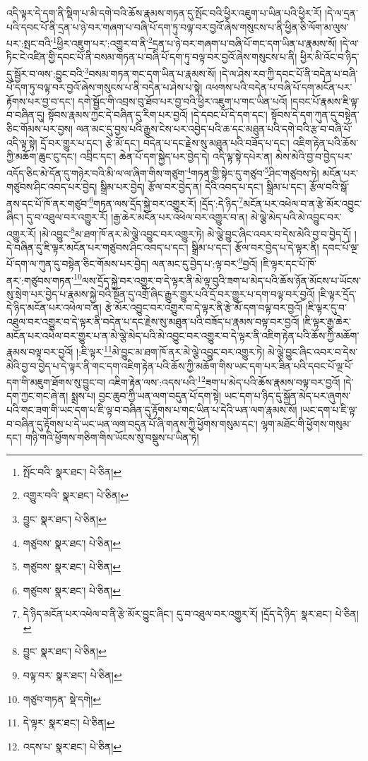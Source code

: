 འདི་ལྟར་དེ་དག་ནི་སྡིག་པ་མི་དགེ་བའི་ཆོས་རྣམས་གཏན་དུ་སྤོང་བའི་ཕྱིར་འཇུག་པ་ཡིན་པའི་ཕྱིར་རོ། །དེ་ལ་དྲན་པའི་དབང་པོ་ནི་དྲན་པ་ཉེ་བར་གཞག་པ་བཞི་པོ་དག་ཏུ་བལྟ་བར་བྱའོ་ཞེས་གསུངས་པ་ནི་ཕྱིན་ཅི་ལོག་མ་ལུས་པར་:སྤང་བའི་\footnote{སྤོང་བའི་  སྣར་ཐང་།  པེ་ཅིན། }ཕྱིར་འཇུག་པར་:འགྱུར་བ་ནི་\footnote{འགྱུར་བའི་  སྣར་ཐང་།  པེ་ཅིན། }དྲན་པ་ཉེ་བར་གཞག་པ་བཞི་པོ་གང་དག་ཡིན་པ་རྣམས་སོ། །དེ་ལ་ཏིང་ངེ་འཛིན་གྱི་དབང་པོ་ནི་བསམ་གཏན་པ་བཞི་པོ་དག་ཏུ་བལྟ་བར་བྱའོ་ཞེས་གསུངས་པ་ནི། ཕྱིར་མི་འོང་བ་ཉིད་དུ་སྦྱོར་བ་ལས་:བྱུང་བའི་\footnote{བྱུང་  སྣར་ཐང་།  པེ་ཅིན། }བསམ་གཏན་གང་དག་ཡིན་པ་རྣམས་སོ། །དེ་ལ་ཤེས་རབ་ཀྱི་དབང་པོ་ནི་བདེན་པ་བཞི་པོ་དག་ཏུ་བལྟ་བར་བྱའོ་ཞེས་གསུངས་པ་ནི་བདེན་པ་ཤེས་པ་སྟེ། འཕགས་པའི་བདེན་པ་བཞི་པོ་དག་མངོན་པར་རྟོགས་པར་བྱ་བ་དང་། དགེ་སྦྱོང་གི་འབྲས་བུ་ཐོབ་པར་བྱ་བའི་ཕྱིར་འཇུག་པ་གང་ཡིན་པའོ། །དབང་པོ་རྣམས་ཇི་ལྟ་བ་བཞིན་དུ། སྟོབས་རྣམས་ཀྱང་དེ་བཞིན་དུ་རིག་པར་བྱའོ། །དེ་དབང་པོ་དེ་དག་དང་། སྟོབས་དེ་དག་ཀུན་དུ་བསྟེན་ཅིང་གོམས་པར་བྱས། ལན་མང་དུ་བྱས་པའི་རྒྱུས་ངེས་པར་འབྱེད་པའི་ཆ་དང་མཐུན་པའི་དགེ་བའི་རྩ་བ་བཞི་པོ་འདི་ལྟ་སྟེ། དྲོ་བར་གྱུར་པ་དང་། རྩེ་མོ་དང་། བདེན་པ་དང་རྗེས་སུ་མཐུན་པའི་བཟོད་པ་དང་། འཇིག་རྟེན་པའི་ཆོས་ཀྱི་མཆོག་ཆུང་ངུ་དང་། འབྲིང་དང་། ཆེན་པོ་དག་སྐྱེད་པར་བྱེད་དེ། འདི་ལྟ་སྟེ་དཔེར་ན། མེས་མེའི་བྱ་བ་བྱེད་པར་འདོད་ཅིང་མེ་དོན་དུ་གཉེར་བའི་མི་ལ་ལ་ཞིག་གིས་གཙུག་\footnote{གཙུབས་  སྣར་ཐང་།  པེ་ཅིན། }གཏན་གྱི་སྟེང་དུ་གཙུབ་\footnote{གཙུབས་  སྣར་ཐང་།  པེ་ཅིན། }ཤིང་གཙུབས་ཏེ། མངོན་པར་གཙུབས་ཤིང་འབད་པར་བྱེད། སྒྲིམ་པར་བྱེད། རྩོལ་བར་བྱེད་ན། དེའི་འབད་པ་དང་། སྒྲིམ་པ་དང་། རྩོལ་བའི་སྒོ་ནས་དང་པོ་ཁོ་ནར་གཙུབ་\footnote{གཙུབས་  སྣར་ཐང་།  པེ་ཅིན། }གཏན་ལས་དྲོད་སྐྱེ་བར་འགྱུར་རོ། །དྲོད་:དེ་ཉིད་\footnote{དེ་ཉིད་མངོན་པར་འཕེལ་བ་ནི་རྩེ་མོར་བྱུང་ཞིང་། དུ་བ་འཐུལ་བར་འགྱུར་རོ། །དྲོད་དེ་ཉིད་  སྣར་ཐང་།  པེ་ཅིན། }མངོན་པར་འཕེལ་བ་ན་རྩེ་མོར་འབྱུང་ཞིང་། དུ་བ་འཐུལ་བར་འགྱུར་རོ། །རྒྱ་ཆེར་མངོན་པར་འཕེལ་བར་འགྱུར་བ་ན། མེ་ལྕེ་མེད་པའི་མེ་འབྱུང་བར་འགྱུར་རོ། །མེ་འབྱུང་\footnote{བྱུང་  སྣར་ཐང་།  པེ་ཅིན། }མ་ཐག་ཁོ་ནར་མེ་ལྕེ་འབྱུང་བར་འགྱུར་ཏེ། མེ་ལྕེ་བྱུང་ཞིང་འབར་བ་དེས་མེའི་བྱ་བ་བྱེད་དོ། །དེ་བཞིན་དུ་ཇི་ལྟར་མངོན་པར་གཙུབས་ཤིང་འབད་པ་དང་། སྒྲིམ་པ་དང་། རྩོལ་བར་བྱེད་པ་དེ་ལྟར་ནི། དབང་པོ་ལྔ་པོ་དག་ལ་ཀུན་དུ་བསྟེན་ཅིང་གོམས་པར་བྱེད། ལན་མང་དུ་བྱེད་པ་:ལྟ་བར་\footnote{བལྟ་བར་  སྣར་ཐང་།  པེ་ཅིན། }བྱའོ། །ཇི་ལྟར་དང་པོ་ཁོ་ནར་:གཙུབས་གཏན་\footnote{གཙུབ་གཏན་  སྡེ་དགེ། }ལས་དྲོད་སྐྱེ་བར་འགྱུར་བ་དེ་ལྟར་ནི་མེ་ལྟ་བུའི་ཟག་པ་མེད་པའི་ཆོས་ཉོན་མོངས་པ་ཡོངས་སུ་སྲེག་པར་བྱེད་པ་རྣམས་སྐྱེ་བའི་སྔོན་དུ་འགྲོ་ཞིང་རྒྱུར་གྱུར་པའི་དྲོ་བར་གྱུར་པ་དག་བལྟ་བར་བྱའོ། །ཇི་ལྟར་དྲོད་དེ་ཉིད་མངོན་པར་འཕེལ་བ་ན། རྩེ་མོར་འབྱུང་བར་འགྱུར་བ་དེ་ལྟར་ནི་རྩེ་མོ་དག་བལྟ་བར་བྱའོ། །ཇི་ལྟར་དུ་བ་འཐུལ་བར་འགྱུར་བ་དེ་ལྟར་ནི་བདེན་པ་དང་རྗེས་སུ་མཐུན་པའི་བཟོད་པ་རྣམས་བལྟ་བར་བྱའོ། །ཇི་ལྟར་རྒྱ་ཆེར་མངོན་པར་འཕེལ་བར་གྱུར་པ་ན་མེ་ལྕེ་མེད་པའི་མེ་འབྱུང་བར་འགྱུར་བ་དེ་ལྟར་ནི་འཇིག་རྟེན་པའི་ཆོས་ཀྱི་མཆོག་རྣམས་བལྟ་བར་བྱའོ། །:ཇི་ལྟར་\footnote{དེ་ལྟར་  སྣར་ཐང་།  པེ་ཅིན། }མེ་བྱུང་མ་ཐག་ཁོ་ནར་མེ་ལྕེ་འབྱུང་བར་འགྱུར་ཏེ། མེ་ལྕེ་བྱུང་ཞིང་འབར་བ་དེས་མེའི་བྱ་བ་བྱེད་པ་དེ་ལྟར་ནི་གང་དག་འཇིག་རྟེན་པའི་ཆོས་ཀྱི་མཆོག་གིས་ཡང་དག་པར་ཟིན་པའི་དབང་པོ་ལྔ་པོ་དག་གི་མཇུག་ཐོགས་སུ་བྱུང་བ། འཇིག་རྟེན་ལས་:འདས་པའི་\footnote{འདས་པ་  སྣར་ཐང་།  པེ་ཅིན། }ཟག་པ་མེད་པའི་ཆོས་རྣམས་བལྟ་བར་བྱའོ། །དེ་དག་ཀྱང་གང་ཞེ་ན། སྨྲས་པ། བྱང་ཆུབ་ཀྱི་ཡན་ལག་བདུན་པོ་དག་སྟེ། ཡང་དག་པ་ཉིད་དུ་སྐྱོན་མེད་པར་ཞུགས་པའི་གང་ཟག་གི་ཡང་དག་པ་ཇི་ལྟ་བ་བཞིན་དུ་རྟོགས་པ་གང་ཡིན་པ་དེའི་ཡན་ལག་རྣམས་སོ། །ཡང་དག་པ་ཇི་ལྟ་བ་བཞིན་དུ་རྟོགས་པ་དེ་ཡང་ཡན་ལག་བདུན་པོ་ཞི་གནས་ཀྱི་ཕྱོགས་གསུམ་དང་། ལྷག་མཐོང་གི་ཕྱོགས་གསུམ་དང་། གཉི་གའི་ཕྱོགས་གཅིག་གིས་ཡོངས་སུ་བསྡུས་པ་ཡིན་ཏེ། 